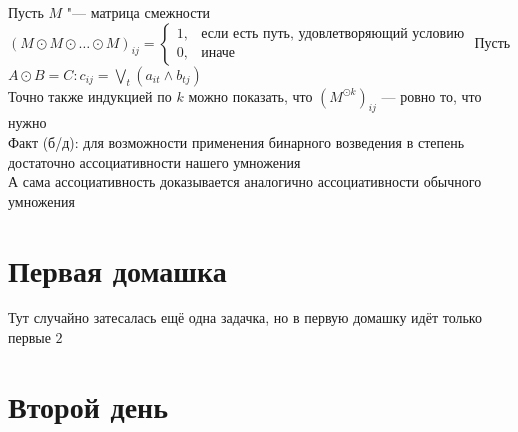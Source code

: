 \documentclass[a4paper, 12pt]{article}
\theoremstyle{plain}
\theoremstyle{definition}
\theoremstyle{remark}
\begin{document}
Пусть $M$ "--- матрица смежности\\
$(M\odot M\odot\dots\odot M)_{ij}=\begin{cases}
	1, &\text{если есть путь, удовлетворяющий условию}\\
	0, &\text{иначе}
\end{cases}$
Пусть $A\odot B=C: c_{ij}=\bigvee\limits_t(a_{it}\wedge b_{tj})$\\
Точно также индукцией по $k$ можно показать, что $(M^{\odot k})_{ij}$ --- ровно то, что нужно\\
Факт (б/д): для возможности применения бинарного возведения в степень достаточно ассоциативности нашего умножения\\
А сама ассоциативность доказывается аналогично ассоциативности обычного умножения
\section[ДЗ1]{Первая домашка}
Тут случайно затесалась ещё одна задачка, но в первую домашку идёт только первые $2$
%
\section{Второй день}
\end{document}
